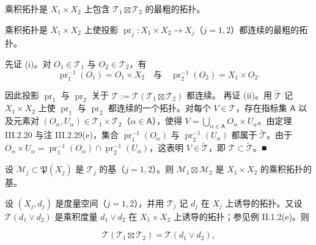 \begin{remark}

\begin{items}
\item

乘积拓扑是 $ X_1 \times X_2 $ 上包含 $ \mathcal{T}_1 \boxtimes \mathcal{T}_2 $ 的最粗的拓扑。

\item

乘积拓扑是 $ X_1 \times X_2 $ 上使投影 $ \operatorname{pr}_j : X_1 \times X_2 \to X_j $（$ j = 1, 2 $）都连续的最粗的拓扑。

\proofhead
先证 (i)。对 $ O_1 \in \mathcal{T}_1 $ 与 $ O_2 \in \mathcal{T}_2 $，有
\[
\operatorname{pr}_1^{-1}(O_1) = O_1 \times X_2 \quad \text{与} \quad \operatorname{pr}_2^{-1}(O_2) = X_1 \times O_2 .
\]

因此投影 $ \operatorname{pr}_1 $ 与 $ \operatorname{pr}_2 $ 关于 $ \mathcal{T} := \mathcal{T}(\mathcal{T}_1 \boxtimes \mathcal{T}_2) $ 都连续。
再证 (ii)。用 $ \widetilde{\mathcal{T}} $ 记 $ X_1 \times X_2 $ 上使 $ \operatorname{pr}_1 $ 与 $ \operatorname{pr}_2 $ 都连续的一个拓扑。对每个 $ V \in \mathcal{T} $，存在指标集 $ \mathsf{A} $ 以及元素对 $ (O_\alpha, U_\alpha) \in \mathcal{T}_1 \times \mathcal{T}_2 $（$ \alpha \in \mathsf{A} $），使得 $ V = \bigcup_{\alpha \in \mathsf{A}} O_\alpha \times U_\alpha $。由定理 III.2.20 与注 III.2.29(e)，集合 $ \operatorname{pr}_1^{-1}(O_\alpha) $ 与 $ \operatorname{pr}_2^{-1}(U_\alpha) $ 都属于 $ \widetilde{\mathcal{T}} $。由于 $ O_\alpha \times U_\alpha = \operatorname{pr}_1^{-1}(O_\alpha) \cap \operatorname{pr}_2^{-1}(U_\alpha) $，这表明 $ V \in \widetilde{\mathcal{T}} $，即 $ \mathcal{T} \subset \widetilde{\mathcal{T}} $。\nobreak\hspace{0.35em}■

\item

设 $ \mathcal{M}_j \subset \mathfrak{P}(X_j) $ 是 $ \mathcal{T}_j $ 的基（$ j = 1, 2 $）。则 $ \mathcal{M}_1 \boxtimes \mathcal{M}_2 $ 是 $ X_1 \times X_2 $ 的乘积拓扑的基。

\item

设 $ (X_j, d_j) $ 是度量空间（$ j = 1, 2 $），并用 $ \mathcal{T}_j $ 记 $ d_j $ 在 $ X_j $ 上诱导的拓扑。又设 $ \mathcal{T}(d_1 \vee d_2) $ 是乘积度量 $ d_1 \vee d_2 $ 在 $ X_1 \times X_2 $ 上诱导的拓扑；参见例 II.1.2(e)。则

\[
\mathcal{T}(\mathcal{T}_1 \boxtimes \mathcal{T}_2) = \mathcal{T}(d_1 \vee d_2) ,
\]


\end{items}
\end{remark}

